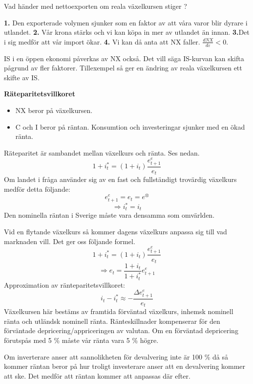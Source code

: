 \documentclass{article}
\begin{document}
Vad händer med nettoexporten om reala växelkursen stiger ? \vspace{5mm} \par \noindent  \textbf{1. }Den exporterade volymen sjunker som en faktor av att våra varor blir dyrare i utlandet. \textbf{2. }Vår krona stärks och vi kan köpa in mer av utlandet än innan. \textbf{3.}Det i sig medför att vår import ökar. \textbf{4. } Vi kan då anta att NX faller. $ \frac{dNX}{d \varepsilon} < 0 $. 

\vspace{5mm} \par \noindent 

IS i en öppen ekonomi påverkas av NX också. Det vill säga IS-kurvan kan skifta pågrund av fler faktorer. Tillexempel så ger en ändring av reala växelkursen ett skifte av IS. 

\textbf{Räteparitetsvillkoret}

\begin{itemize}
     \item NX beror på växelkursen.
     \item C och I beror på räntan. Konsumtion och investeringar sjunker med en ökad ränta. 
\end{itemize}

Räteparitet är sambandet mellan växelkurs och ränta. Ses nedan. 
$$
1+ i^*_t = (1+i_t) \frac{e_{t+1}^e}{e_t}
$$
Om landet i fråga använder sig av en fast och fullständigt trovärdig växelkurs medför detta följande: 
$$
e_{t+1}^e = e_t = e^\otimes
$$
$$
\Rightarrow i^*_t = i_t 
$$
Den nominella räntan i Sverige måste vara densamma som omvärlden. \vspace{5mm} \par \noindent Vid en flytande växelkurs så kommer dagens växelkurs anpassa sig till vad marknaden vill. Det ger oss följande formel. 
$$
1+ i^*_t = (1+i_t) \frac{e_{t+1}^e}{e_t}
$$
$$
\Rightarrow e_t = \frac{1+i_t}{1+i_t^*} e_{t+1}^e
$$
Approximation av ränteparitetsvillkoret: 
$$
i_t - i^*_t \approx - \frac{\Delta e^e_{t+1}}{e_t}
$$
Växelkursen här bestäms av framtida förväntad växelkurs, inhemsk nominell ränta och utländsk nominell ränta. Ränteskillnader kompenserar för den förväntade depricering/appriceringen av valutan. Om en förväntad depricering förutspås med 5 \% måste vår ränta vara 5 \% högre. \vspace{5mm} \par \noindent Om inverterare anser att sannolikheten för devalvering inte är 100 \% då så kommer räntan beror på hur troligt investerare anser att en devalvering kommer att ske. Det medför att räntan kommer att anpassas där efter. 
\end{document}
